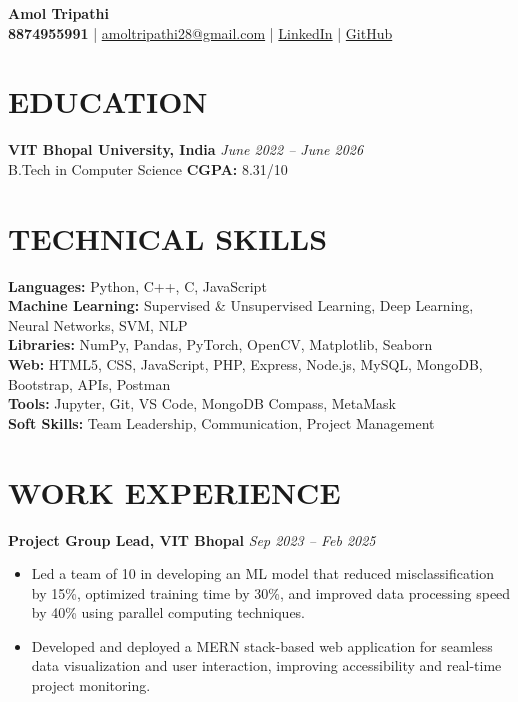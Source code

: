 \documentclass[a4paper,10pt]{article}
\begin{document}
\begin{center}
    \textbf{\Huge Amol Tripathi} \\
    \vspace{0.2em}
    \textbf{8874955991} \quad | \quad 
    \href{mailto:amoltripathi28@gmail.com}{amoltripathi28@gmail.com} \quad | \quad
    \href{https://www.linkedin.com/in/amol-tri12/}{LinkedIn} \quad | \quad \href{https://github.com/amoltrip28}{GitHub}
\end{center}

\section*{EDUCATION}
\textbf{VIT Bhopal University, India} \hfill \textit{June 2022 – June 2026} \\
B.Tech in Computer Science \hfill \textbf{CGPA:} 8.31/10

\section*{TECHNICAL SKILLS}
\textbf{Languages:} Python, C++, C, JavaScript \\
\textbf{Machine Learning:} Supervised & Unsupervised Learning, Deep Learning, Neural Networks, SVM, NLP \\
\textbf{Libraries:} NumPy, Pandas, PyTorch, OpenCV, Matplotlib, Seaborn \\
\textbf{Web:} HTML5, CSS, JavaScript, PHP, Express, Node.js, MySQL, MongoDB, Bootstrap, APIs, Postman \\
\textbf{Tools:} Jupyter, Git, VS Code, MongoDB Compass, MetaMask \\
\textbf{Soft Skills:} Team Leadership, Communication, Project Management

\section*{WORK EXPERIENCE}

\textbf{Project Group Lead, VIT Bhopal} \hfill \textit{Sep 2023 – Feb 2025} \\
\begin{itemize}[leftmargin=1em]
    \item Led a team of 10 in developing an ML model that reduced misclassification by 15\%, optimized training time by 30\%, and improved data processing speed by 40\% using parallel computing techniques.
    \item Developed and deployed a MERN stack-based web application for seamless data visualization and user interaction, improving accessibility and real-time project monitoring.
\end{itemize}
\end{document}
